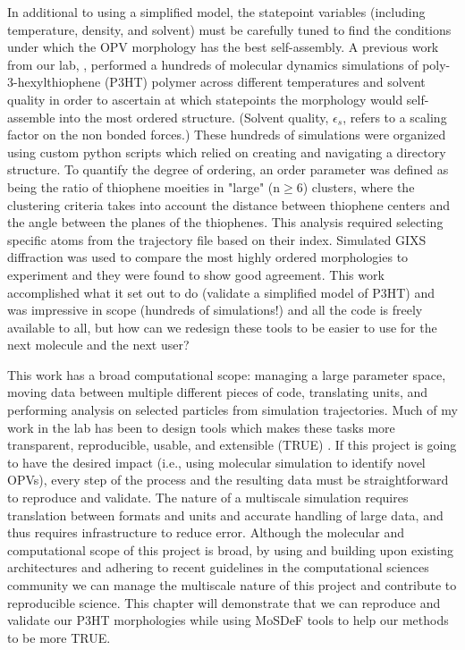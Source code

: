 In additional to using a simplified model, the statepoint variables (including temperature, density, and solvent) must be carefully tuned to find the conditions under which the OPV morphology has the best self-assembly. 
A previous work from our lab, \citet{Miller2018}, performed a hundreds of molecular dynamics simulations of poly-3-hexylthiophene (P3HT) polymer across different temperatures and solvent quality in order to ascertain at which statepoints the morphology would self-assemble into the most ordered structure.
(Solvent quality, $\epsilon_{s}$, refers to a scaling factor on the non bonded forces.)
These hundreds of simulations were organized using custom python scripts which relied on creating and navigating a directory structure.
To quantify the degree of ordering, an order parameter was defined as being the ratio of thiophene moeities in "large" (n$\ge$6) clusters, where the clustering criteria takes into account the distance between thiophene centers and the angle between the planes of the thiophenes.
This analysis required selecting specific atoms from the trajectory file based on their index.
Simulated GIXS diffraction was used to compare the most highly ordered morphologies to experiment and they were found to show good agreement.
This work accomplished what it set out to do (validate a simplified model of P3HT) and was impressive in scope (hundreds of simulations!) and all the code is freely available to all, but how can we redesign these tools to be easier to use for the next molecule and the next user? 

This work has a broad computational scope: managing a large parameter space, moving data between multiple different pieces of code, translating units, and performing analysis on selected particles from simulation trajectories.
Much of my work in the lab has been to design tools which makes these tasks more transparent, reproducible, usable, and extensible (TRUE) \citep{Thompson2020}.
If this project is going to have the desired impact (i.e., using molecular simulation to identify novel OPVs), every step of the process and the resulting data must be straightforward to reproduce and validate.
The nature of a multiscale simulation requires translation between formats and units and accurate handling of large data, and thus requires infrastructure to reduce error.
Although the molecular and computational scope of this project is broad, by using and building upon existing architectures and adhering to recent guidelines in the computational sciences community we can manage the multiscale nature of this project and contribute to reproducible science.
This chapter will demonstrate that we can reproduce and validate our P3HT morphologies while using MoSDeF tools to help our methods to be more TRUE.

